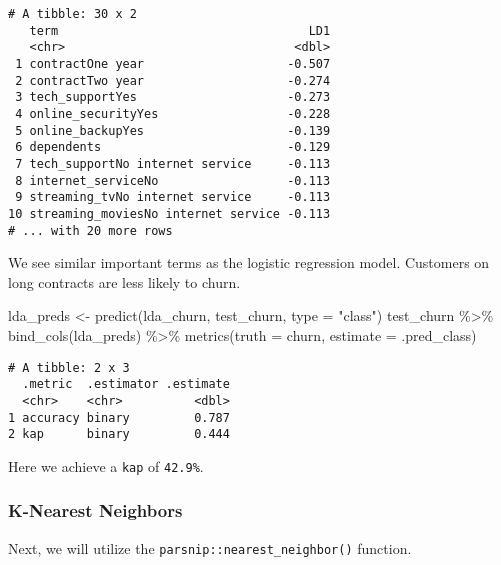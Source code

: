 \documentclass[
]{article}
\newenvironment{Shaded}{\begin{snugshade}}{\end{snugshade}}
\newcommand{\AttributeTok}[1]{\textcolor[rgb]{0.77,0.63,0.00}{#1}}
\newcommand{\FunctionTok}[1]{\textcolor[rgb]{0.00,0.00,0.00}{#1}}
\newcommand{\NormalTok}[1]{#1}
\newcommand{\OtherTok}[1]{\textcolor[rgb]{0.56,0.35,0.01}{#1}}
\newcommand{\SpecialCharTok}[1]{\textcolor[rgb]{0.00,0.00,0.00}{#1}}
\newcommand{\StringTok}[1]{\textcolor[rgb]{0.31,0.60,0.02}{#1}}
\begin{document}
\begin{verbatim}
# A tibble: 30 x 2
   term                                   LD1
   <chr>                                <dbl>
 1 contractOne year                    -0.507
 2 contractTwo year                    -0.274
 3 tech_supportYes                     -0.273
 4 online_securityYes                  -0.228
 5 online_backupYes                    -0.139
 6 dependents                          -0.129
 7 tech_supportNo internet service     -0.113
 8 internet_serviceNo                  -0.113
 9 streaming_tvNo internet service     -0.113
10 streaming_moviesNo internet service -0.113
# ... with 20 more rows
\end{verbatim}

We see similar important terms as the logistic regression model.
Customers on long contracts are less likely to churn.

\begin{Shaded}
\begin{Highlighting}[]
\NormalTok{lda\_preds }\OtherTok{\textless{}{-}} \FunctionTok{predict}\NormalTok{(lda\_churn, test\_churn, }\AttributeTok{type =} \StringTok{"class"}\NormalTok{) }
\NormalTok{test\_churn }\SpecialCharTok{\%\textgreater{}\%}
  \FunctionTok{bind\_cols}\NormalTok{(lda\_preds) }\SpecialCharTok{\%\textgreater{}\%}
  \FunctionTok{metrics}\NormalTok{(}\AttributeTok{truth =}\NormalTok{ churn, }\AttributeTok{estimate =}\NormalTok{ .pred\_class)}
\end{Highlighting}
\end{Shaded}

\begin{verbatim}
# A tibble: 2 x 3
  .metric  .estimator .estimate
  <chr>    <chr>          <dbl>
1 accuracy binary         0.787
2 kap      binary         0.444
\end{verbatim}

Here we achieve a \texttt{kap} of \texttt{42.9\%}.

\hypertarget{k-nearest-neighbors}{%
\subsubsection{K-Nearest Neighbors}\label{k-nearest-neighbors}}

Next, we will utilize the \texttt{parsnip::nearest\_neighbor()}
function.
\end{document}
